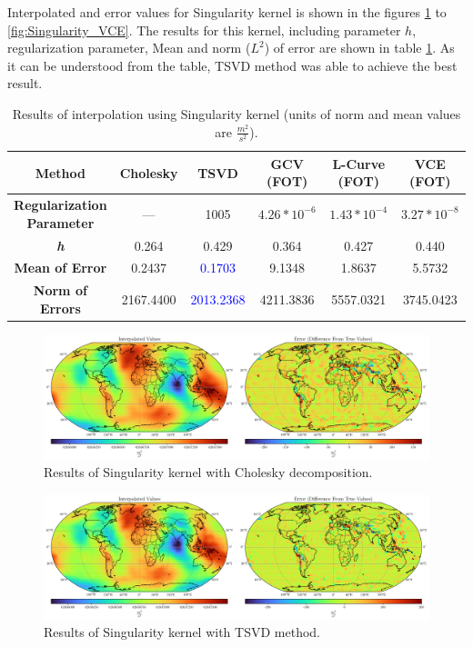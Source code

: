 \documentclass[12pt]{article}
\begin{document}
	Interpolated and error values for Singularity kernel is shown in the figures \ref{fig:Singularity_Chol} to \ref{fig:Singularity_VCE}. The results for this kernel, including parameter $h$, regularization parameter, Mean and norm ($L^2$) of error are shown in table \ref{tab:Singularity_Results}. As it can be understood from the table, TSVD method was able to achieve the best result.
	
	\begin{table}[h!]
		\centering
		\caption{Results of interpolation using Singularity kernel (units of norm and mean values are $\frac{m^2}{s^2}$).}
		\vspace{0.2cm}
		\renewcommand{\arraystretch}{2}
		\begin{tabular}{c|c|c|c|c|c}
			\textbf{Method} & Cholesky & TSVD & GCV (FOT) & L-Curve (FOT) & VCE (FOT) \\
			\hline 
			\makecell{\textbf{Regularization} \\ \textbf{Parameter}} & --- & 1005 & $4.26*10^{-6}$ & $1.43*10^{-4}$ & $3.27*10^{-8}$ \\
			\hline 
			\textit{\textbf{h}} & 0.264 & 0.429 & 0.364 & 0.427 & 0.440 \\
			\hline
			\textbf{Mean of Error} & 0.2437 & \textcolor{blue}{0.1703} & 9.1348 & 1.8637 & 5.5732 \\
			\hline 
			\textbf{Norm of Errors} & 2167.4400 & \textcolor{blue}{2013.2368} & 4211.3836 & 5557.0321 & 3745.0423 \\
		\end{tabular}
		\label{tab:Singularity_Results}
	\end{table}
	
	
	\begin{figure}[h!]
		\centering
		\includegraphics[width=16cm]{../Outputs/Plots/Plot_Singularity_Cholesky.pdf}
		\caption{Results of Singularity kernel with Cholesky decomposition.}
		\label{fig:Singularity_Chol}
	\end{figure}
	
	\begin{figure}[h!]
		\centering
		\includegraphics[width=16cm]{../Outputs/Plots/Plot_Singularity_TSVD.pdf}
		\caption{Results of Singularity kernel with TSVD method.}
		\label{fig:Singularity_TSVD}
	\end{figure}
	
\end{document}
